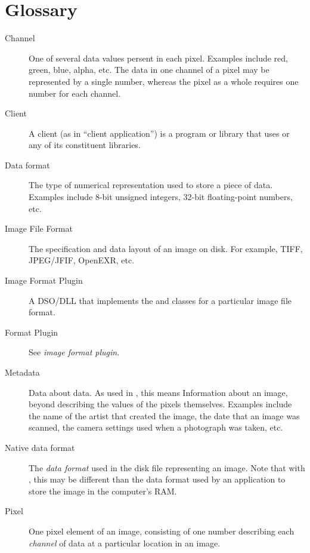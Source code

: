 \chapter{Glossary}

\begin{description}

\item[Channel] One of several data values persent in each pixel.
  Examples include red, green, blue, alpha, etc.  The data in one
  channel of a pixel may be represented by a single number, whereas the
  pixel as a whole requires one number for each channel.

\item[Client] A client (as in ``client application'') is a program or
  library that uses \product or any of its constituent libraries.

\item[Data format] The type of numerical representation used to
  store a piece of data.  Examples include 8-bit unsigned integers,
  32-bit floating-point numbers, etc.

\item[Image File Format] The specification and data layout of an
  image on disk.  For example, TIFF, JPEG/JFIF, OpenEXR, etc.

\item[Image Format Plugin] A DSO/DLL that implements the \ImageInput
  and \ImageOutput classes for a particular image file format.

\item[Format Plugin] See \emph{image format plugin}.

\item[Metadata] Data about data.  As used in \product, this means
  Information about an image, beyond describing the values of the pixels
  themselves.  Examples include the name of the artist that created the
  image, the date that an image was scanned, the camera settings used
  when a photograph was taken, etc.

\item[Native data format] The \emph{data format} used in the disk file
  representing an image.  Note that with \product, this may be different
  than the data format used by an application to store the image
  in the computer's RAM.

\item[Pixel] One pixel element of an image, consisting of one number
  describing each \emph{channel} of data at a particular location in an
  image.


\end{description}
